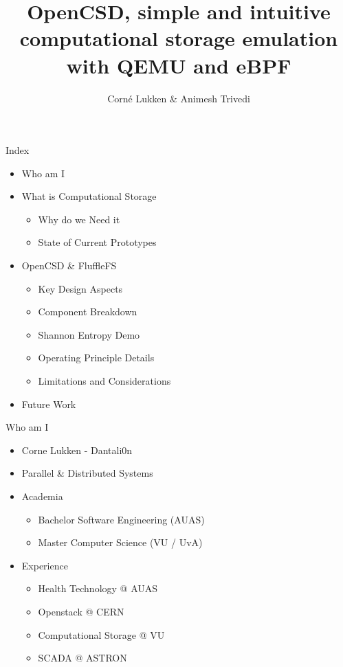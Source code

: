 \documentclass{beamer}
\author{Corné Lukken \& Animesh Trivedi}
\title{OpenCSD, simple and intuitive computational storage emulation with QEMU and eBPF}
\begin{document}

\frame{\titlepage}
\begin{frame}{Index}
    \begin{itemize}
        \item Who am I
        \item What is Computational Storage
        \begin{itemize}
            \item \footnotesize Why do we Need it
            \item \footnotesize State of Current Prototypes
        \end{itemize}
        \item OpenCSD \& FluffleFS
        \begin{itemize}
            \item \footnotesize Key Design Aspects
            \item \footnotesize Component Breakdown
            \item \footnotesize Shannon Entropy Demo
            \item \footnotesize Operating Principle Details
            \item \footnotesize Limitations and Considerations
        \end{itemize}
        \item Future Work
    \end{itemize}
\end{frame}

\begin{frame}{Who am I}
    \begin{itemize}
        \item Corne Lukken - Dantali0n
        \item Parallel \& Distributed Systems
        \item Academia
        \begin{itemize}
            \item \footnotesize Bachelor Software Engineering (AUAS)
            \item \footnotesize Master Computer Science (VU / UvA)
        \end{itemize}
        \item Experience
        \begin{itemize}
            \item \footnotesize Health Technology @ AUAS
            \item \footnotesize Openstack @ CERN
            \item \footnotesize Computational Storage @ VU
            \item \footnotesize SCADA @ ASTRON
        \end{itemize}
    \end{itemize}
\end{frame}
\end{document}
